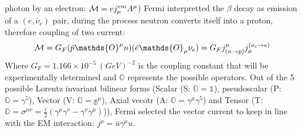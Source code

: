 photon by an electron: $\mathcal{M} = ej_\mu^{em} A^\mu$) Fermi interpretted the $\beta$
decay as emission of a $(e, \bar{\nu}_e)$ pair, during the process neutron converts
itself into a proton, therefore coupling of two current:
\begin{equation}
    \CM = G_F (\bar{p} \mathds{O}^\mu n)(\bar{e} \mathds{O}_\mu \nu_e) 
	= G_F j^\mu_{(n\rightarrow p)} j_\mu^{(\nu_e\rightarrow e)}
\end{equation}
Where $G_F = 1.166 \times 10^{-5} \ (GeV)^{-2}$ is the coupling constant that 
will be experimentally determined and $\mathds{O}$ represents 
the possible operators. Out of the 5 possible Lorentz invariant bilinear forms 
(Scalar (S: $\mathds{O} = \mathds{1}$), pseudoscalar (P: $\mathds{O} = \gamma^5$), 
Vector (V: $\mathds{O} = \mathds{\gamma^\mu}$), Axial vecotr (A: $\mathds{O} = \gamma^\mu\gamma^5$) 
and Tensor (T: $\mathds{O}=\sigma^{\mu\nu} = \frac{i}{2}(\gamma^\mu\gamma^\nu - \gamma^\nu\gamma^\mu)$)),
Fermi selected the vector current to keep in line with the EM interaction:
$j^\mu = \bar{u} \gamma^\mu u$.

